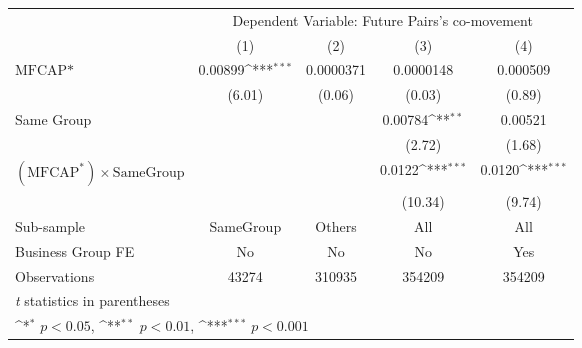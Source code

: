 {
\def\sym#1{\ifmmode^{#1}\else\(^{#1}\)\fi}
\begin{tabular}{l*{4}{c}}
\hline\hline
                &\multicolumn{4}{c}{Dependent Variable:  Future Pairs's co-movement}        \\\cmidrule(lr){2-5}
                &\multicolumn{1}{c}{(1)}         &\multicolumn{1}{c}{(2)}         &\multicolumn{1}{c}{(3)}         &\multicolumn{1}{c}{(4)}         \\
\hline
$ \text{MFCAP*} $&  0.00899\sym{***}&0.0000371         &0.0000148         & 0.000509         \\
                &   (6.01)         &   (0.06)         &   (0.03)         &   (0.89)         \\
[1em]
Same Group      &                  &                  &  0.00784\sym{**} &  0.00521         \\
                &                  &                  &   (2.72)         &   (1.68)         \\
[1em]
 $ (\text{MFCAP}^*) \times {\text{SameGroup} }  $ &                  &                  &   0.0122\sym{***}&   0.0120\sym{***}\\
                &                  &                  &  (10.34)         &   (9.74)         \\
\hline
Sub-sample      &SameGroup         &   Others         &      All         &      All         \\
Business Group FE&       No         &       No         &       No         &      Yes         \\
Observations    &    43274         &   310935         &   354209         &   354209         \\
\hline\hline
\multicolumn{5}{l}{\footnotesize \textit{t} statistics in parentheses}\\
\multicolumn{5}{l}{\footnotesize \sym{*} \(p<0.05\), \sym{**} \(p<0.01\), \sym{***} \(p<0.001\)}\\
\end{tabular}
}
